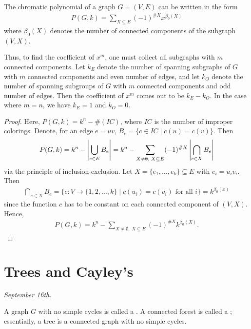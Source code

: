 \begin{theorem}
    The chromatic polynomial of a graph $G = (V,E)$ can be written in the form
    \begin{align}
        P(G,k) = \sum_{X \subseteq E} (-1)^{\#X}x^{\beta_{0}(X)}
    \end{align}
    where $\beta_{0}(X)$ denotes the number of connected components of the subgraph $(V,X)$.
\end{theorem}
Thus, to find the coefficient of $x^{m}$, one must collect all subgraphs with $m$ connected components. Let $k_{E}$ denote the number of spanning subgraphs of $G$ with $m$ connected components and even number of edges, and let $k_{O}$ denote the number of spanning subgroups of $G$ with $m$ connected components and odd number of edges. Then the coefficient of $x^{m}$ comes out to be $k_{E}-k_{O}$. In the case where $m = n$, we have $k_{E} = 1$ and $k_{O} = 0$.

\begin{proof}
    Here, $P(G,k) = k^{n} - \#(IC)$, where $IC$ is the number of improper colorings. Denote, for an edge $e = uv$, $B_{e} = \{c \in IC \mid c(u) = c(v)\}$. Then
    \begin{align}
        P(G,k) = k^{n} - \left| \bigcup_{e \in E} B_{e} \right| = k^{n} - \sum_{X \neq \emptyset,\;X \subseteq E} (-1)^{\#X}\left| \bigcap_{e \in X} B_{e} \right|
    \end{align}
    via the principle of inclusion-exclusion. Let $X = \{e_{1},\ldots,e_{k}\} \subseteq E$ with $e_{i} = u_{i}v_{i}$. Then
    \begin{align}
        \bigcap_{e \in X} B_{e} = \{c:V \to \{1,2,\ldots,k\} \mid c(u_{i}) = c(v_{i}) \text{ for all } i\} = k^{\beta_{0}(x)}
    \end{align}
    since the function $c$ has to be constant on each connected component of $(V,X)$. Hence,
    \begin{align}
        P(G,k) = k^{n} - \sum_{X \neq \emptyset,\;X \subseteq E} (-1)^{\#X} k^{\beta_{0}(X)}.
    \end{align}
\end{proof}

\section{Trees and Cayley's}

\textit{September 16th.}

\begin{definition}
    A graph $G$ with no simple cycles is called a . A connected forest is called a ; essentially, a tree is a connected graph with no simple cycles.
\end{definition}

